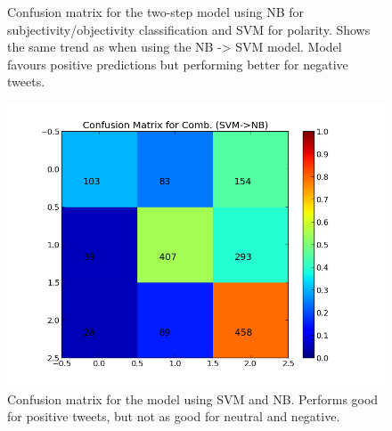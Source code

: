 \begin{minipage}[!htb]{\linewidth}
\begin{minipage}{0.45\linewidth}
\begin{figure}[H]
           \caption[Plot showing the confusion matrix for two-step NB -> MaxEnt]{Confusion matrix for the two-step model using NB for subjectivity/objectivity classification and SVM for polarity. Shows the same trend as when using the NB -> SVM model. Model favours positive predictions but performing better for negative tweets.}
           \label{fig:confmat_nb_maxent}
          \end{figure}
     \end{minipage}
\end{minipage}

\begin{minipage}[!htb]{\linewidth}
     \centering
     \begin{minipage}{0.45\linewidth}
           \begin{figure}[H]
                \includegraphics[width=\linewidth]{../img/plots/grid/confusion_matrix_Comb-SVM-NB.png}
        		\caption[Plot showing the confusion matrix for two-step SVM -> NB]{Confusion matrix for the model using SVM and NB. Performs good for positive tweets, but not as good for neutral and negative.}
            \label{fig:confmat_svm_nb}
           \end{figure}
      \end{minipage}
      \hspace{0.05\linewidth}
      \begin{minipage}{0.45\linewidth}
           \begin{figure}[H]

\end{figure}
\end{minipage}
\end{minipage}

